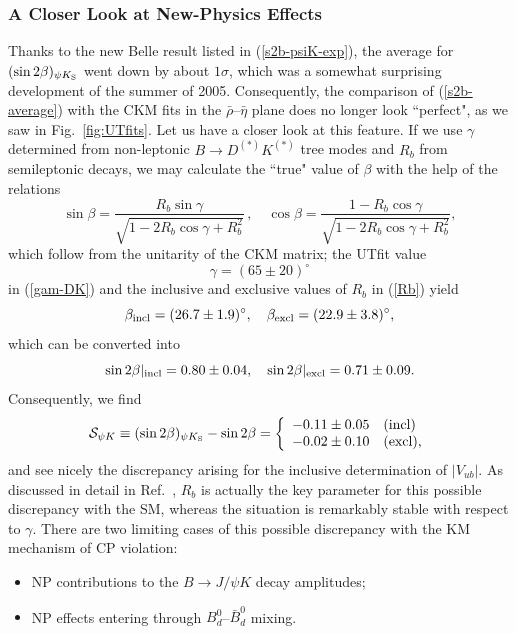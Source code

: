 \documentclass[11pt]{cernrep}
\begin{document}
\subsubsection{A Closer Look at New-Physics Effects}
%
%
%
Thanks to the new Belle result listed in (\ref{s2b-psiK-exp}), the average for
$(\sin2\beta)_{\psi K_{\rm S}}$ went down by about $1 \sigma$, which 
was a somewhat surprising development of the summer of 2005. Consequently, 
the comparison of (\ref{s2b-average}) with the CKM fits in the
$\bar\rho$--$\bar\eta$ plane does no longer look ``perfect", as we saw 
in Fig.~\ref{fig:UTfits}. Let us have a closer look at this feature.
If we use $\gamma$ determined from non-leptonic $B\to D^{(*)} K^{(*)}$ 
tree modes and $R_b$ from semileptonic decays, we may calculate
the ``true" value of $\beta$ with the help of the relations
\begin{equation}
\sin\beta=\frac{R_b\sin\gamma}{\sqrt{1-2R_b\cos\gamma+R_b^2}}\,, \quad
\cos\beta=\frac{1-R_b\cos\gamma}{\sqrt{1-2R_b\cos\gamma+R_b^2}},
\end{equation}
which follow from the unitarity of the CKM matrix; the UTfit value 
\begin{equation}\label{gamma-tree}
\gamma=(65\pm20)^\circ
\end{equation}
in (\ref{gam-DK}) and the inclusive and exclusive values of $R_b$ in 
(\ref{Rb}) yield
\begin{equation}\label{beta-true}
\beta_{\rm incl} = (26.7\pm 1.9)^{\circ},\quad 
\beta_{\rm excl} = (22.9\pm3.8)^\circ,
\end{equation}
which can be converted into
\begin{equation}
\sin2\beta|_{\rm incl} = 0.80\pm0.04,\quad 
\sin2\beta|_{\rm excl} = 0.71\pm0.09.
\end{equation}
Consequently, we find
\begin{equation}\label{S-psi-K}
{\cal S}_{\psi K}\equiv (\sin 2\beta)_{\psi K_{\rm S}}-\sin 2\beta=
\left\{\begin{array}{ll}
-0.11\pm0.05 & \mbox{(incl)}\\
-0.02\pm0.10 & \mbox{(excl),}
\end{array}
\right.
\end{equation}
and see nicely the discrepancy arising for the inclusive determination of
$|V_{ub}|$. As discussed in detail in Ref.~\cite{BF-DMs}, $R_b$ is actually
the key parameter for this possible discrepancy with the SM, whereas 
the situation is remarkably stable with respect to $\gamma$. There are two 
limiting cases of this possible discrepancy with the KM mechanism of CP violation: 
\begin{itemize}
\item NP contributions to the $B\to J/\psi K$ decay amplitudes;
\item NP effects entering through $B^0_d$--$\bar B^0_d$ mixing. 
\end{itemize}
\end{document}
